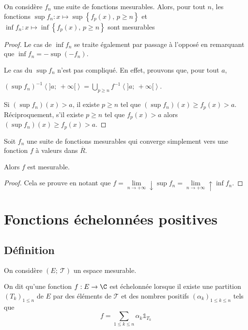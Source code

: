 \begin{prop}
On considère $f_n$ une suite de fonctions mesurables. Alors, pour tout $n$, les fonctions $\sup f_n: x \mapsto \sup\left\{f_p(x), \, p \geq n\right\}$ et $\inf f_n: x \mapsto \inf\left\{f_p(x), \, p \geq n\right\}$ sont mesurables
\end{prop}

\begin{proof}
Le cas de $\inf f_n$ se traite également par passage à l'opposé en remarquant que $\inf f_n = -\sup (-f_n)$.

Le cas du $\sup f_n$ n'est pas compliqué. En effet, prouvons que, pour tout $a$, 

$\left(\sup f_n\right)^{-1}\left<]a;~+\infty[\right> = \bigcup \limits_{p \geq n} f^{-1}\left<]a;~+\infty[\right>$.

Si $\left(\sup f_n\right)(x)>a$, il existe $p \geq n$ tel que $\left(\sup f_n\right)(x) \geq f_p(x) > a$. Réciproquement, s'il existe $p \geq n$ tel que $f_p(x)>a$ alors $\left(\sup f_n\right)(x) \geq f_p(x) > a$.
\end{proof}

\begin{theo}
Soit $f_n$ une suite de fonctions mesurables qui converge simplement vers une fonction $f$ à valeurs dans $\overline{R}$.

Alors $f$ est mesurable.
\end{theo}

\begin{proof}
Cela se prouve en notant que $f = \lim \limits_{n \to +\infty} \downarrow \sup f_n = \lim \limits_{n \to +\infty} \uparrow \inf f_n$.
\end{proof}

\section{Fonctions échelonnées positives}

\subsection{Définition}

On considère $\left(E;~\mathcal{T}\right)$ un espace mesurable.

On dit qu'une fonction $f: E \to \C$ est échelonnée lorsque il existe une partition $\left( T_k \right)_{1 \leq n}$ de $E$ par des éléments de $\mathcal{T}$ et des nombres positifs $\left(\alpha_k\right)_{1 \leq k \leq n}$ tels que
\[
f = \displaystyle{\sum \limits_{1 \leq k \leq n}} \alpha_k \mathbb{1}_{T_k}
\]

